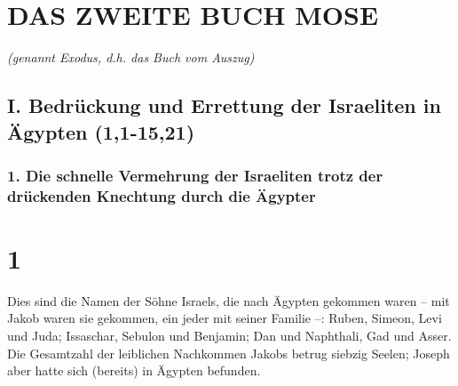 \hypertarget{das-zweite-buch-mose}{%
\section{DAS ZWEITE BUCH MOSE}\label{das-zweite-buch-mose}}

\emph{(genannt Exodus, d.h. das Buch vom Auszug)}

\hypertarget{i.-bedruxfcckung-und-errettung-der-israeliten-in-uxe4gypten-11-1521}{%
\subsection{I. Bedrückung und Errettung der Israeliten in Ägypten
(1,1-15,21)}\label{i.-bedruxfcckung-und-errettung-der-israeliten-in-uxe4gypten-11-1521}}

\hypertarget{die-schnelle-vermehrung-der-israeliten-trotz-der-druxfcckenden-knechtung-durch-die-uxe4gypter}{%
\subsubsection{1. Die schnelle Vermehrung der Israeliten trotz der
drückenden Knechtung durch die
Ägypter}\label{die-schnelle-vermehrung-der-israeliten-trotz-der-druxfcckenden-knechtung-durch-die-uxe4gypter}}

\hypertarget{section}{%
\section{1}\label{section}}

 Dies sind die Namen der Söhne Israels, die nach Ägypten
gekommen waren -- mit Jakob waren sie gekommen, ein jeder mit seiner
Familie --:  Ruben, Simeon, Levi und Juda; 
Issaschar, Sebulon und Benjamin;  Dan und Naphthali, Gad
und Asser.  Die Gesamtzahl der leiblichen Nachkommen
Jakobs betrug siebzig Seelen; Joseph aber hatte sich (bereits) in
Ägypten befunden.

